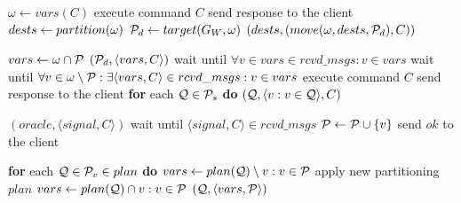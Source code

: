 \begin{algorithm}[h!]
\small

\begin{distribalgo}[1]

	\STATE $\omega \leftarrow vars(C)$
		\STATE execute command $C$
		\STATE send response to the client
			\STATE $dests \leftarrow partition(\omega)$
			\STATE $\mathcal{P}_d \leftarrow target(G_W, \omega)$
			\STATE \amcast$(dests, (move(\omega,dests,\mathcal{P}_d), C))$
	\ENDIF
\ENDINDENT

\vspace{1.0mm}
		\STATE $vars \leftarrow \omega \cap \mathcal{P}$
		\STATE \rmcast$(\mathcal{P}_d, \langle vars, C \rangle)$
		\STATE wait until $\forall v \in vars \in rcvd\_msgs : v \in vars$
		\STATE wait until $\forall v \in \omega \setminus \mathcal{P}: \exists \langle vars, C \rangle \in rcvd\_msgs :v \in vars$
		\STATE execute command $C$
		\STATE send response to the client
		\STATE \textbf{for} each $\mathcal{Q} \in \mathcal{P}_s$ \textbf{do} \rmcast$(\mathcal{Q}, \langle v:v \in \mathcal{Q} \rangle, C)$
	\ENDIF
\ENDINDENT

\vspace{1.0mm}
	\STATE \rmcast$(oracle, \langle signal, C \rangle )$
	\STATE wait until $\langle signal, C \rangle \in rcvd\_msgs$
	\STATE $\mathcal{P} \leftarrow \mathcal{P} \cup \{v\}$
	\STATE send $ok$ to the client
\ENDINDENT

\vspace{1.0mm}
	\STATE \textbf{for} each $\mathcal{Q} \in \mathcal{P}_v \in plan$ \textbf{do} 
			\STATE $vars \leftarrow plan(\mathcal{Q}) \setminus v:v \in \mathcal{P}$
				\STATE apply new partitioning $plan$
			\ENDIF
		\ELSE 
			\STATE $vars \leftarrow plan(\mathcal{Q}) \cap v:v \in \mathcal{P}$
			\STATE \rmcast$(\mathcal{Q}, \langle vars, \mathcal{P} \rangle )$
		\ENDIF
\ENDINDENT


\end{distribalgo}
\end{algorithm}
